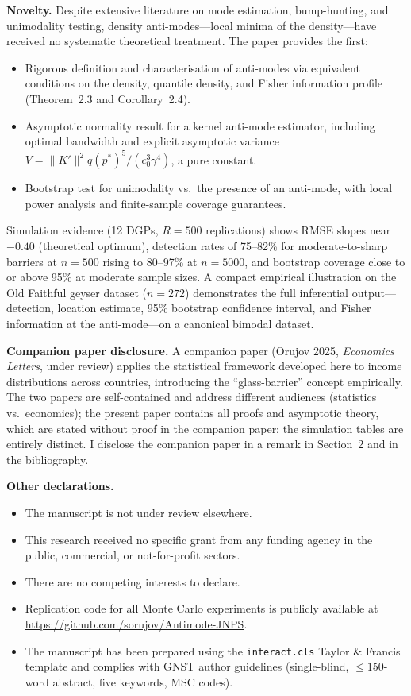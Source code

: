 \documentclass[12pt,a4paper]{article}
\begin{document}
\noindent\textbf{Novelty.}
Despite extensive literature on mode estimation, bump-hunting, and
unimodality testing, density anti-modes---local minima of the density---have
received no systematic theoretical treatment.  The paper provides the first:
\begin{itemize}
  \item Rigorous definition and characterisation of anti-modes via equivalent
    conditions on the density, quantile density, and Fisher information
    profile (Theorem~2.3 and Corollary~2.4).
  \item Asymptotic normality result for a kernel anti-mode estimator,
    including optimal bandwidth and explicit asymptotic variance
    $V = \|K'\|^2 q(p^*)^5 / (c_0^3 \gamma^4)$, a pure constant.
  \item Bootstrap test for unimodality vs.\ the presence of an anti-mode,
    with local power analysis and finite-sample coverage guarantees.
\end{itemize}
Simulation evidence (12 DGPs, $R=500$ replications) shows RMSE slopes
near $-0.40$ (theoretical optimum), detection rates of 75--82\% for
moderate-to-sharp barriers at $n=500$ rising to 80--97\% at $n=5000$,
and bootstrap coverage close to or above 95\% at moderate sample sizes.
A compact empirical illustration on the Old Faithful geyser dataset
($n=272$) demonstrates the full inferential output---detection, location
estimate, 95\% bootstrap confidence interval, and Fisher information at
the anti-mode---on a canonical bimodal dataset.

\medskip

\noindent\textbf{Companion paper disclosure.}
A companion paper (Orujov 2025, \textit{Economics Letters}, under review)
applies the statistical framework developed here to income distributions
across countries, introducing the ``glass-barrier'' concept empirically.
The two papers are self-contained and address different audiences
(statistics vs.\ economics); the present paper contains all proofs and asymptotic theory,
which are stated without proof in the companion paper; the simulation
tables are entirely distinct.  I disclose the
companion paper in a remark in Section~2 and in the bibliography.

\medskip

\noindent\textbf{Other declarations.}
\begin{itemize}
  \item The manuscript is not under review elsewhere.
  \item This research received no specific grant from any funding agency
    in the public, commercial, or not-for-profit sectors.
  \item There are no competing interests to declare.
  \item Replication code for all Monte Carlo experiments is publicly
    available at \url{https://github.com/sorujov/Antimode-JNPS}.
  \item The manuscript has been prepared using the \texttt{interact.cls}
    Taylor \& Francis template and complies with GNST author guidelines
    (single-blind, $\leq 150$-word abstract, five keywords, MSC codes).
\end{itemize}
\end{document}
